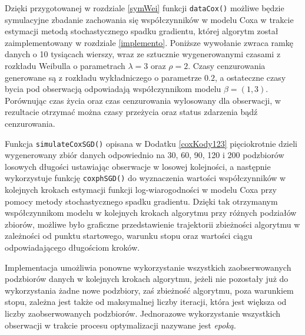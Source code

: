 Dzięki przygotowanej w rozdziale \ref{symWei} funkcji \texttt{dataCox()} możliwe będzie symulacyjne zbadanie zachowania się współczynników w modelu Coxa w trakcie estymacji metodą stochastycznego spadku gradientu, której algorytm został zaimplementowany w rozdziale \ref{implemento}. Poniższe wywołanie zwraca ramkę danych o 10 tysiącach wierszy, wraz ze sztucznie wygenerowanymi czasami z rozkładu Weibulla o parametrach $\lambda =3$ oraz $\rho =2$. Czasy cenzurowania generowane są z rozkładu wykładniczego o parametrze $0.2$, a ostateczne czasy bycia pod obserwacją odpowiadają współczynnikom modelu $\beta = (1,3)$. Porównując czas życia oraz czas cenzurowania wylosowany dla obserwacji, w rezultacie otrzymać można czasy przeżycia oraz status zdarzenia bądź cenzurowania. 
\begin{Shaded}
\begin{Highlighting}[]
\StringTok{ }\NormalTok{(}\NormalTok{(}\NormalTok{:}\NormalTok{, } \NormalTok{, } \NormalTok{), } \NormalTok{)}
\StringTok{ }\NormalTok{(}\NormalTok{^}\NormalTok{, } \NormalTok{, }  \NormalTok{(}\NormalTok{,}\NormalTok{), } \NormalTok{) }
\end{Highlighting}
\end{Shaded}
Funkcja \texttt{simulateCoxSGD()} opisana w Dodatku \ref{coxKody123} pięciokrotnie dzieli wygenerowany zbiór danych odpowiednio na 30, 60, 90, 120 i 200 podzbiorów losowych długości ustawiając obserwacje w losowej kolejności, a następnie wykorzystuje funkcję \texttt{coxphSGD()} do wyznaczenia wartości współczynników w kolejnych krokach estymacji funkcji log-wiarogodności w modelu Coxa przy pomocy metody stochastycznego spadku gradientu. Dzięki tak otrzymanym współczynnikom modelu w kolejnych krokach algorytmu przy różnych podziałów zbiorów, możliwe było graficzne przedstawienie trajektorii zbieżności algorytmu w zależności od punktu startowego, warunku stopu oraz wartości ciągu odpowiadającego długościom kroków. 

Implementacja umożliwia ponowne wykorzystanie wszystkich zaobserwowanych podzbiorów danych w kolejnych krokach algorytmu, jeżeli nie pozostały już do wykorzystania żadne nowe podzbiory, zaś zbieżność algorytmu, poza warunkiem stopu, zależna jest także od maksymalnej liczby iteracji, która jest większa od liczby zaobserwowanych podzbiorów. Jednorazowe wykorzystanie wszystkich obserwacji w trakcie procesu optymalizacji nazywane jest \textit{epoką}. 


